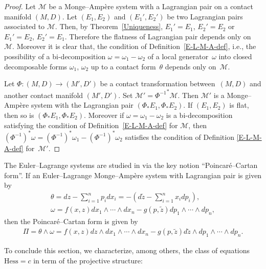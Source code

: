 \documentclass[pdftex]{sigma}
\begin{document}
\begin{proof}
Let ${\mathcal M}$ be a Monge--Amp{\`e}re system with a Lagrangian pair on a contact manifold
$(M, D)$.
Let $(E_1, E_2)$ and $(E_1', E_2')$ be two Lagrangian pairs associated to ${\mathcal M}$.
Then, by Theorem~\ref{Uniqueness}, $E_1' = E_1$, $E_2' = E_2$ or $E_1' = E_2$, $E_2' = E_1$.
Therefore the f\/latness of Lagrangian pair depends only on~${\mathcal M}$.
Moreover it is clear that, the condition of Def\/inition~\ref{E-L-M-A-def},
i.e., the possibility of a bi-decomposition $\omega =
\omega_1 - \omega_2$ of a local generator~$\omega$ into closed decomposable
forms $\omega_1$, $\omega_2$ up to a contact form~$\theta$ depends only on~${\mathcal M}$.

Let $\Phi \colon  (M, D) \to (M', D')$ be a contact transformation between~$(M, D)$ and
another contact manifold $(M', D')$. Set ${\mathcal M}' = {\Phi^{-1}}^*{\mathcal M}$.
Then ${\mathcal M}'$ is a Monge--Amp{\`e}re system with the Lagrangian pair
$(\Phi_*E_1, \Phi_*E_2)$. If $(E_1, E_2)$ is f\/lat, then so is $(\Phi_*E_1, \Phi_*E_2)$.
Moreover if $\omega = \omega_1 - \omega_2$ is a bi-decomposition satisfying
the condition of Def\/inition~\ref{E-L-M-A-def} for ${\mathcal M}$, then
$({\Phi^{-1}})^*\omega = ({\Phi^{-1}})^*\omega_1 - ({\Phi^{-1}})^*\omega_2$
satisf\/ies the condition of Def\/inition \ref{E-L-M-A-def} for~${\mathcal M}'$.
\end{proof}


\begin{Rem}
\label{Poincare-Cartan form}
The Euler--Lagrange systems are studied in \cite{B-G-G} via the key notion ``Poincar\'{e}--Cartan form''.
If an Euler--Lagrange Monge--Amp{\`e}re system with Lagrangian pair
is given by
\begin{gather*}
\theta = dz - \sum_{i=1}^n p_i dx_i = - \left(d\tilde{z} - \sum_{i=1}^n x_i dp_i\right), \\
\omega = f(x, z) dx_1 \wedge \cdots \wedge dx_n - g(p, \tilde{z}) dp_1\wedge \cdots \wedge dp_n,
\end{gather*}
then the Poincar\'{e}--Cartan form is given by
\begin{gather*}
\Pi = \theta\wedge\omega = f(x, z) dz \wedge dx_1 \wedge \cdots \wedge dx_n
- g(p, \tilde{z}) d\tilde{z} \wedge dp_1\wedge \cdots \wedge dp_n.
\end{gather*}
\end{Rem}


To conclude this section,
we characterize, among others, the class of equations $\mathrm{Hess} = c$
in term of the projective structure:
\end{document}

